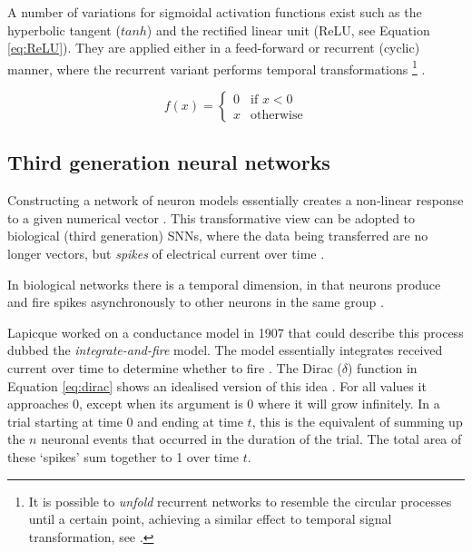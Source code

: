 \documentclass[report.tex]{subfiles}
\begin{document}
A number of variations for sigmoidal activation functions exist such as the 
hyperbolic tangent ($tanh$) and
the rectified linear unit  (ReLU, see Equation \ref{eq:ReLU}). 
They are applied either in a feed-forward or recurrent (cyclic) manner, where
the recurrent variant performs temporal transformations
\footnote{It is possible to \textit{unfold} recurrent
networks to resemble the circular processes until a certain point, achieving
a similar effect to temporal signal transformation, see \cite{Mozer1995}.}
\cite{Schmidhuber2014}.

\begin{equation} \label{eq:ReLU}
f(x) = \begin{cases}
         0 & \text{if } x < 0 \\
	 x & \text{otherwise}
       \end{cases}
\end{equation}

\subsection{Third generation neural networks}
Constructing a network of neuron models essentially creates a non-linear
response to a given numerical vector \cite{Russel2007}.
This transformative view can be adopted to biological (third generation)
\glspl{SNN}, where the data being transferred are no longer vectors, but 
\textit{spikes}
of electrical current over time \cite[p. 32]{Dayan2001, Eliasmith2004}.

In biological networks there is a temporal dimension, in that neurons
produce and fire spikes asynchronously to other neurons in the same
group \cite{Eliasmith2004}.

Lapicque worked on a conductance model in 1907 that could describe this
process dubbed the \textit{integrate-and-fire} 
model.
The model essentially integrates received current over time
to determine whether to fire
\cite{Dayan2001, Eliasmith2004}.
The Dirac ($\delta$) function 
in Equation \ref{eq:dirac} shows an idealised
version of this idea \cite[p. 404]{Dayan2001}.
For all values it approaches 0, except when its argument is
0 where it will grow infinitely.
In a trial starting at time $0$ and ending at time $t$, this
is the equivalent of summing up the $n$ neuronal events that occurred in 
the duration of the trial.
The total area of these `spikes' sum together to 1 over time $t$. 
\end{document}
